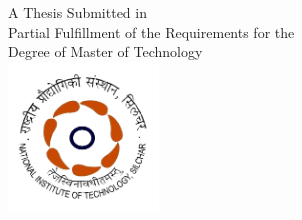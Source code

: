 \begin{titlepage}
    \begin{center}
    
        \vspace{4cm}
        \LARGE
        \textbf{\thesistitle}
        
        \vspace{2.5cm}
        \large{A Thesis Submitted in\\
Partial Fulfillment of the Requirements for the\\
Degree of Master of Technology}\\[8pt]
        \vspace{2.5cm}
        \includegraphics[width=0.3\textwidth]{images/NIT_Silchar_logo.png}\\
        \vspace{2cm}
        \LARGE
        \textbf{\authornamefl}\\
        \authorcnp\\
        \vspace{2.5cm}
        \Large
        {\textbf{\faculty}}\\
        \large
        \MakeUppercase{\university}\\
        \Large \promotion
        
    \end{center}
\end{titlepage}